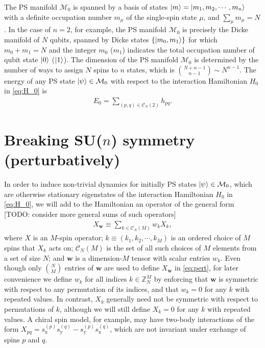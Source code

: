 \documentclass[nofootinbib,notitlepage,11pt]{revtex4-2}
\newcommand{\p}[1]{\left(#1\right)} %
\renewcommand{\set}[1]{\left\{#1\right\}} %
\newcommand{\m}{\bm} %
\newcommand{\1}{\mathds{1}}
\newcommand{\x}{\text{x}}
\newcommand{\y}{\text{y}}
\newcommand{\C}{\mathcal{C}}
\newcommand{\M}{\mathcal{M}}
\newcommand{\ZZ}{\mathbb{Z}}
\newcommand{\red}[1]{{\color{red} #1}}
\begin{document}
The PS manifold $\M_0$ is spanned by a basis of states
$\ket{m}=\ket{m_1,m_2,\cdots,m_n}$ with a definite occupation number
$m_\mu$ of the single-spin state $\mu$, and $\sum_\mu m_\mu=N$.  In
the case of $n=2$, for example, the PS manifold $\M_0$ is precisely
the Dicke manifold\cite{dicke1954coherence} of $N$ qubits, spanned by
Dicke states $\set{\ket{m_0,m_1}}$ for which $m_0+m_1=N$ and the
integer $m_0$ ($m_1$) indicates the total occupation number of qubit
state $\ket{0}$ ($\ket{1}$).  The dimension of the PS manifold $\M_0$
is determined by the number of ways to assign $N$ spins to $n$ states,
which is ${N+n-1 \choose n-1}\sim N^{n-1}$.  The energy of any PS
state $\ket\psi\in\M_0$ with respect to the interaction Hamiltonian
$H_0$ in \eqref{eq:H_0} is
\begin{align}
  E_0 = \sum_{\p{p,q}\in\C_N\p{2}} h_{pq}.
\end{align}

\section{Breaking SU($n$) symmetry (perturbatively)}
\label{eq:pert_theory}

In order to induce non-trivial dynamics for initially PS states
$\ket\psi\in\M_0$, which are otherwise stationary eigenstates of the
interaction Hamiltonian $H_0$ in \eqref{eq:H_0}, we will add to the
Hamiltonian an operator of the general form \red{[TODO: consider more
  general sums of such operators]}
\begin{align}
  X_{\m w} \equiv \sum_{k\in\C_N\p{M}} w_k X_k,
  \label{eq:pert}
\end{align}
where $X$ is an $M$-spin operator; $k\equiv\p{k_1,k_2,\cdots,k_M}$ is
an ordered choice of $M$ spins that $X_k$ acts on; $\C_N\p{M}$ is the
set of all such choices of $M$ elements from a set of size $N$; and
$\m w$ is a dimension-$M$ tensor with scalar entries $w_k$.  Even
though only ${N\choose M}$ entries of $\m w$ are used to define
$X_{\m w}$ in \eqref{eq:pert}, for later convenience we define $w_k$
for all indices $k\in\ZZ_N^M$ by enforcing that $\m w$ is symmetric
with respect to any permutation of its indices, and that $w_k=0$ for
any $k$ with repeated values.  In contrast, $X_k$ generally need not
be symmetric with respect to permutations of $k$, although we will
still define $X_k=0$ for any $k$ with repeated values.  A chiral spin
model, for example, may have two-body interactions of the form
$X_{pq}=s_\x^{(p)}s_\y^{(q)}-s_\y^{(p)}s_\x^{(q)}$, which are not
invariant under exchange of spins $p$ and $q$.
\end{document}
